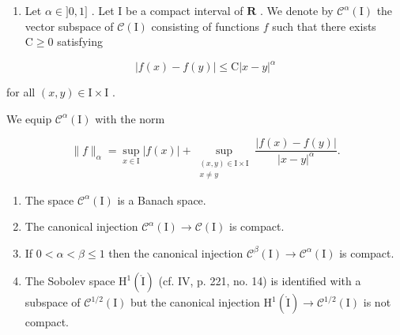 \begin{enumerate}
\def\labelenumi{\arabic{enumi})}
\setcounter{enumi}{3}
\tightlist
\item
  Let \(\alpha \in ]0,1]\) . Let I be a compact interval of \(\mathbf{R}\) . We denote by \(\mathcal{C}^{\alpha}(\mathrm{I})\) the vector subspace of \(\mathcal{C}(\mathrm{I})\) consisting of functions \(f\) such that there exists \(\mathrm{C} \geqslant 0\) satisfying
\end{enumerate}

\[
| f (x) - f (y) | \leqslant \mathrm{C} | x - y | ^ {\alpha}
\]

for all \((x,y)\in\mathrm{I}\times\mathrm{I}\) .

We equip \(\mathcal{C}^{\alpha}(\mathrm{I})\) with the norm

\[
\| f\|_{\alpha} = \sup_{x\in \mathrm{I}}|f(x)| + \sup_{\substack{(x,y)\in \mathrm{I}\times \mathrm{I}\\ x\neq y}}\frac{|f(x) - f(y)|}{|x - y|^{\alpha}}.
\]

\begin{enumerate}
\def\labelenumi{\alph{enumi})}
\item
  The space \(\mathcal{C}^{\alpha}(\mathrm{I})\) is a Banach space.
\item
  The canonical injection \(\mathcal{C}^{\alpha}(\mathrm{I})\to \mathcal{C}(\mathrm{I})\) is compact.
\item
  If \(0 < \alpha < \beta \leqslant 1\) then the canonical injection \(\mathcal{C}^{\beta}(\mathrm{I}) \to \mathcal{C}^{\alpha}(\mathrm{I})\) is compact.\\
\item
  The Sobolev space \(\mathrm{H}^{1}(\mathring{\mathrm{I}})\) (cf. IV, p. 221, no. 14) is identified with a subspace of \(\mathcal{C}^{1/2}(\mathrm{I})\) but the canonical injection \(\mathrm{H}^{1}(\mathring{\mathrm{I}}) \to \mathcal{C}^{1/2}(\mathrm{I})\) is not compact.
\end{enumerate}

